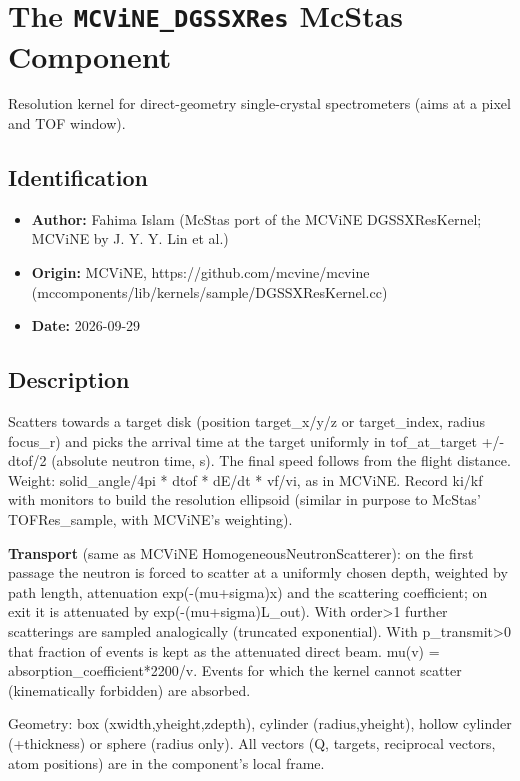 \section{The \texttt{MCViNE\_DGSSXRes} McStas Component}
Resolution kernel for direct-geometry single-crystal spectrometers (aims at a pixel and TOF window).

\subsection*{Identification}
\begin{itemize}
  \item \textbf{Author:} Fahima Islam (McStas port of the MCViNE DGSSXResKernel; MCViNE by J. Y. Y. Lin et al.)
  \item \textbf{Origin:} MCViNE, https://github.com/mcvine/mcvine (mccomponents/lib/kernels/sample/DGSSXResKernel.cc)
  \item \textbf{Date:} 2026-09-29
\end{itemize}

\subsection*{Description}
Scatters towards a target disk (position target\_x/y/z or target\_index, radius focus\_r) and picks the arrival time at the target uniformly in tof\_at\_target +/- dtof/2 (absolute neutron time, s). The final speed follows from the flight distance. Weight: solid\_angle/4pi * dtof * dE/dt * vf/vi, as in MCViNE. Record ki/kf with monitors to build the resolution ellipsoid (similar in purpose to McStas' TOFRes\_sample, with MCViNE's weighting).

\textbf{Transport} (same as MCViNE HomogeneousNeutronScatterer): on the first passage the neutron is forced to scatter at a uniformly chosen depth, weighted by path length, attenuation exp(-(mu+sigma)x) and the scattering coefficient; on exit it is attenuated by exp(-(mu+sigma)L\_out). With order\textgreater{}1 further scatterings are sampled analogically (truncated exponential). With p\_transmit\textgreater{}0 that fraction of events is kept as the attenuated direct beam. mu(v) = absorption\_coefficient*2200/v. Events for which the kernel cannot scatter (kinematically forbidden) are absorbed.

Geometry: box (xwidth,yheight,zdepth), cylinder (radius,yheight), hollow cylinder (+thickness) or sphere (radius only). All vectors (Q, targets, reciprocal vectors, atom positions) are in the component's local frame.

